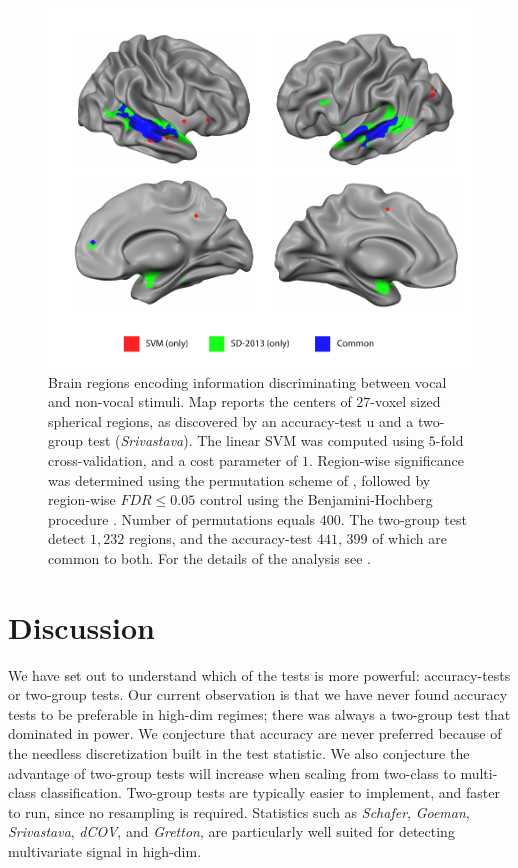 \documentclass[oupdraft]{bio}
\begin{document}
\begin{figure}[th]
	\centering
	\includegraphics[width=0.5\columnwidth]{"svm_vs_SD"}
	\caption{\footnotesize
		Brain regions encoding information discriminating between vocal and non-vocal stimuli.
		Map reports the centers of $27$-voxel sized spherical regions, as discovered by an accuracy-test u and a two-group test (\emph{Srivastava}). 
		The linear SVM was computed using $5$-fold cross-validation, and a cost parameter of $1$. 
		Region-wise significance was determined using the permutation scheme of \cite{stelzer_statistical_2013}, followed by region-wise $FDR \leq 0.05$ control using the Benjamini-Hochberg procedure \citep{benjamini_controlling_1995}.
		Number of permutations equals $400$.
		The two-group test detect $1,232$ regions, and the accuracy-test $441$, $399$ of which are common to both.
		For the details of the analysis see \cite{gilron_quantifying_2016}.  
	}
	\label{fig:read_data}
\end{figure}








\section{Discussion}
\label{sec:discussion}

We have set out to understand which of the tests is more powerful: accuracy-tests or two-group tests. 
Our current observation is that we have never found accuracy tests to be preferable in high-dim regimes; there was always a two-group test that dominated in power.
We conjecture that accuracy are never preferred because of the needless discretization built in the test statistic.
We also conjecture the advantage of two-group tests will increase when scaling from two-class to multi-class classification.
Two-group tests are typically easier to implement, and faster to run, since no resampling is required. 
Statistics such as \emph{Schafer}, \emph{Goeman}, \emph{Srivastava}, \emph{dCOV}, and \emph{Gretton}, are particularly well suited for detecting multivariate signal in high-dim.
\end{document}
